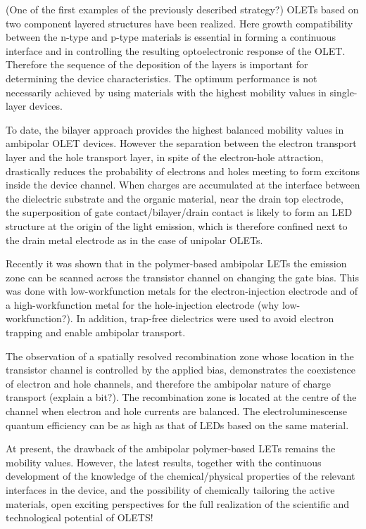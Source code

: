 (One of the first examples of the previously described strategy?) OLETs based on two component layered structures have been realized. Here growth compatibility between the n-type and p-type materials is essential in forming a continuous interface and in controlling the resulting optoelectronic response of the OLET. Therefore the sequence of the deposition of the layers is important for determining the device characteristics. The optimum performance is not necessarily achieved by using materials with the highest mobility values in single-layer devices. 

To date, the bilayer approach provides the highest balanced mobility values in ambipolar OLET devices. However the separation between the electron transport layer and the hole transport layer, in spite of the electron-hole attraction, drastically reduces the probability of electrons and holes meeting to form excitons inside the device channel. When charges are accumulated at the interface between the dielectric substrate and the organic material, near the drain top electrode, the superposition of gate contact/bilayer/drain contact is likely to form an LED structure at the origin of the light emission, which is therefore confined next to the drain metal electrode as in the case of unipolar OLETs.

Recently it was shown that in the polymer-based ambipolar LETs the emission zone can be scanned across the transistor channel on changing the gate bias. This was done with low-workfunction metals for the electron-injection electrode and of a high-workfunction metal for the hole-injection electrode (why low-workfunction?). In addition, trap-free dielectrics were used to avoid electron trapping and enable ambipolar transport. 

The observation of a spatially resolved recombination zone whose location in the transistor channel is controlled by the applied bias, demonstrates the coexistence of electron and hole channels, and therefore the ambipolar nature of charge transport (explain a bit?). The recombination zone is located at the centre of the channel when electron and hole currents are balanced. The electroluminescense quantum efficiency can be as high as that of LEDs based on the same material. 

At present, the drawback of the ambipolar polymer-based LETs remains the mobility values. However, the latest results, together with the continuous development of the knowledge of the chemical/physical properties of the relevant interfaces in the device, and the possibility of chemically tailoring the active materials, open exciting perspectives for the full realization of the scientific and technological potential of OLETS!




